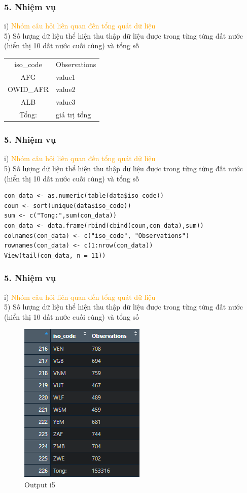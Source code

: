 \documentclass[english,10pt,table]{beamer}
\begin{document}
\begin{frame}[fragile]
\frametitle{5.  Nhiệm vụ}
	i) \textcolor{orange}{Nhóm câu hỏi liên quan đến tổng quát dữ liệu}\\
	5) Số lượng dữ liệu thể hiện thu thập dữ liệu được trong từng từng đất nước (hiển thị 10 dất nước cuối cùng) và tổng số
		\begin{center}
			\begin{tabular}{ c l }
				iso\_code & Observations \\ 
				AFG & value1  \\ 
				OWID\_AFR & value2 \\
				ALB & value3\\
				Tổng: & giá trị tổng
			\end{tabular}
		\end{center}
\end{frame}

\begin{frame}[fragile]
\frametitle{5.  Nhiệm vụ}
	i) \textcolor{orange}{Nhóm câu hỏi liên quan đến tổng quát dữ liệu}\\
	5) Số lượng dữ liệu thể hiện thu thập dữ liệu được trong từng từng đất nước (hiển thị 10 dất nước cuối cùng) và tổng số
	\begin{lstlisting}[frame=single]  
con_data <- as.numeric(table(data$iso_code))
coun <- sort(unique(data$iso_code))
sum <- c("Tong:",sum(con_data))
con_data <- data.frame(rbind(cbind(coun,con_data),sum))
colnames(con_data) <- c("iso_code", "Observations")
rownames(con_data) <- c(1:nrow(con_data))
View(tail(con_data, n = 11))
	\end{lstlisting}
\end{frame}

\begin{frame}[fragile]
\frametitle{5.  Nhiệm vụ}
	i) \textcolor{orange}{Nhóm câu hỏi liên quan đến tổng quát dữ liệu}\\
	5) Số lượng dữ liệu thể hiện thu thập dữ liệu được trong từng từng đất nước (hiển thị 10 dất nước cuối cùng) và tổng số
\begin{figure}[h!]
	\begin{center}
		    \includegraphics[scale = 0.5]{Images/I/I5.png}
		            \caption{Output i5}
		\end{center}
		\end{figure}
\end{frame}
\end{document}

